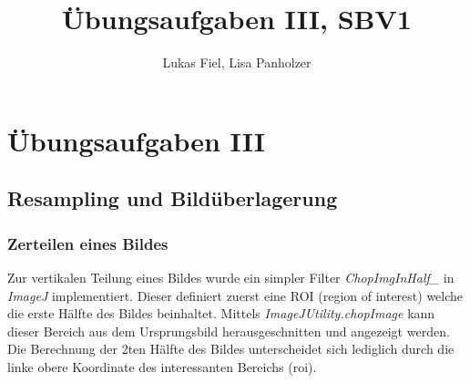 \documentclass[12pt,german]{article}
\begin{document}
\title{Übungsaufgaben III, SBV1 }
\author{Lukas Fiel, Lisa Panholzer}
\maketitle


\newpage
\section{Übungsaufgaben III}
\subsection{Resampling und Bildüberlagerung}
\subsubsection{Zerteilen eines Bildes}
\label{chopImg}
Zur vertikalen Teilung eines Bildes wurde ein simpler Filter \textit{ChopImgInHalf\_} in \textit{ImageJ} implementiert. Dieser definiert zuerst eine ROI (region of interest) welche die erste Hälfte des Bildes beinhaltet. Mittels \textit{ImageJUtility.chopImage} kann dieser Bereich aus dem Ursprungsbild herausgeschnitten und angezeigt werden. Die Berechnung der 2ten Hälfte des Bildes unterscheidet sich lediglich durch die linke obere Koordinate des interessanten Bereichs (roi). 
\end{document}
